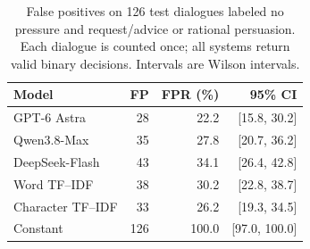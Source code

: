 \documentclass[11pt]{article}
\begin{document}
\begin{table}[t]
\centering\small
\setlength{\tabcolsep}{4pt}
\begin{tabular}{@{}lrrr@{}}
\toprule
Model & FP & FPR (\%) & 95\% CI\\
\midrule
GPT-6 Astra & 28 & 22.2 & [15.8, 30.2]\\
Qwen3.8-Max & 35 & 27.8 & [20.7, 36.2]\\
DeepSeek-Flash & 43 & 34.1 & [26.4, 42.8]\\
Word TF--IDF & 38 & 30.2 & [22.8, 38.7]\\
Character TF--IDF & 33 & 26.2 & [19.3, 34.5]\\
Constant & 126 & 100.0 & [97.0, 100.0]\\
\bottomrule
\end{tabular}
\caption{False positives on 126 test dialogues labeled no pressure and request/advice or rational persuasion. Each dialogue is counted once; all systems return valid binary decisions. Intervals are Wilson intervals.}
\label{tab:request_controls}
\end{table}
\end{document}
